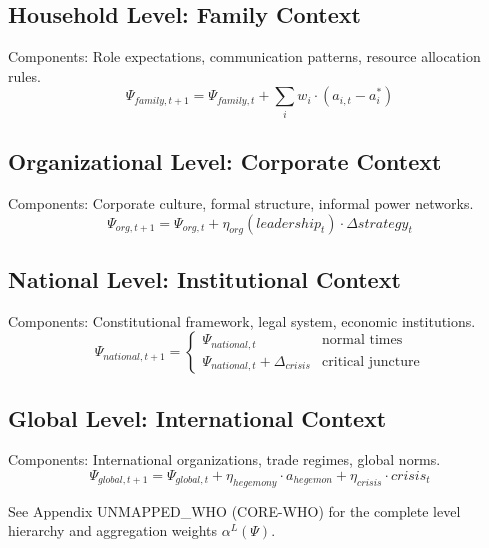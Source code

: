 \subsection{Household Level: Family Context}

Components: Role expectations, communication patterns, resource allocation rules.
\begin{equation}
\Psi_{family, t+1} = \Psi_{family, t} + \sum_i w_i \cdot (a_{i,t} - a_i^*)
\end{equation}

\subsection{Organizational Level: Corporate Context}

Components: Corporate culture, formal structure, informal power networks.
\begin{equation}
\Psi_{org, t+1} = \Psi_{org, t} + \eta_{org}(leadership_t) \cdot \Delta strategy_t
\end{equation}

\subsection{National Level: Institutional Context}

Components: Constitutional framework, legal system, economic institutions.
\begin{equation}
\Psi_{national, t+1} = \begin{cases}
\Psi_{national, t} & \text{normal times} \\
\Psi_{national, t} + \Delta_{crisis} & \text{critical juncture}
\end{cases}
\end{equation}

\subsection{Global Level: International Context}

Components: International organizations, trade regimes, global norms.
\begin{equation}
\Psi_{global, t+1} = \Psi_{global, t} + \eta_{hegemony} \cdot a_{hegemon} + \eta_{crisis} \cdot crisis_t
\end{equation}

\begin{cross-reference}
See Appendix UNMAPPED_WHO (CORE-WHO) for the complete level hierarchy
and aggregation weights $\alpha^L(\Psi)$.
\end{cross-reference}


